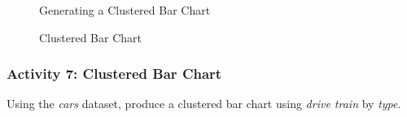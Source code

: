\begin{figure}[H]
  \begin{center}
    \caption{Generating a Clustered Bar Chart}
    \label{lab02_fig19}
  \end{center}
\end{figure}

\begin{figure}[H]
  \begin{center}
    \caption{Clustered Bar Chart}
    \label{lab02_fig20}
  \end{center}
\end{figure}

\subsubsection{Activity 7: Clustered Bar Chart} \label{lab02_act07}

Using the \textit{cars} dataset, produce a clustered bar chart using \textit{drive train} by \textit{type}.

